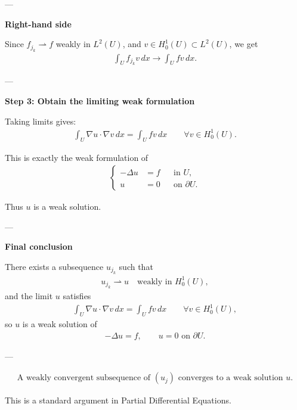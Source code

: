 \documentclass[12pt,a4paper]{report}
\begin{document}
\begin{enumerate}
\begin{description}
\begin{description}
---

\item \textbf{Right-hand side}

Since $f_{j_k}\rightharpoonup f$ weakly in $L^2(U)$, and $v\in H_0^1(U)\subset L^2(U)$, we get
\begin{align*}
\int_U f_{j_k}v\,dx
\to
\int_U fv\,dx.
\end{align*}

---
\end{description}

\item \textbf{Step 3: Obtain the limiting weak formulation}

Taking limits gives:
\begin{align*}
\int_U \nabla u\cdot \nabla v\,dx = \int_U fv\,dx \qquad\forall v\in H_0^1(U).
\end{align*}

This is exactly the weak formulation of
\begin{align*}
\left\{
\begin{aligned}
-\Delta u&=f &&\text{in }U,\\
u&=0 &&\text{on }\partial U.
\end{aligned}
\right.
\end{align*}

Thus $u$ is a weak solution.

---

\item \textbf{Final conclusion}

There exists a subsequence $u_{j_k}$ such that
\begin{align*}
u_{j_k}\rightharpoonup u
\quad\text{weakly in }H_0^1(U),
\end{align*}
and the limit $u$ satisfies
\begin{align*}
\int_U \nabla u\cdot\nabla v\,dx=\int_U fv\,dx
\qquad\forall v\in H_0^1(U),
\end{align*}
so $u$ is a weak solution of
\begin{align*}
-\Delta u=f,\qquad u=0\text{ on }\partial U.
\end{align*}

---
\end{description}

\begin{align*}
\boxed{\text{A weakly convergent subsequence of }(u_j)\text{ converges to a weak solution }u.}
\end{align*}

This is a standard  argument in Partial Differential Equations.


\end{enumerate}
\end{document}
